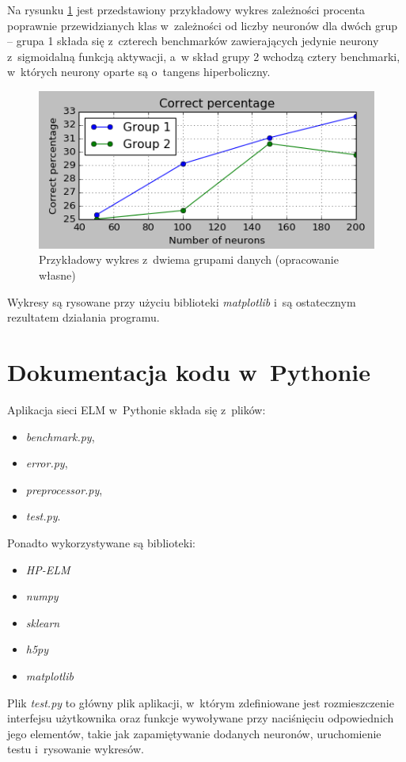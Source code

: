 \documentclass[pl]{minipw} %
\begin{document}
Na rysunku \ref{przykladowy} jest przedstawiony przykładowy wykres zależności procenta poprawnie przewidzianych klas w~zależności od liczby neuronów dla dwóch grup -- grupa 1 składa się z~czterech benchmarków zawierających jedynie neurony z~sigmoidalną funkcją aktywacji, a~w skład grupy 2 wchodzą cztery benchmarki, w~których neurony oparte są o~tangens hiperboliczny. 
 
\begin{figure}[H]
\includegraphics[width=\textwidth]{przykladowy_wykres.png}
\caption[Przykładowy wykres z~dwiema grupami danych]{Przykładowy wykres z~dwiema grupami danych (opracowanie własne)}
\label{przykladowy}
\end{figure}


Wykresy są rysowane przy użyciu biblioteki \textit{matplotlib} i~są ostatecznym rezultatem działania programu.

\section{Dokumentacja kodu w~Pythonie}
Aplikacja sieci ELM w~Pythonie składa się z~plików:
\begin{itemize}
\item \textit{benchmark.py},
\item \textit{error.py}, 
\item \textit{preprocessor.py},
\item \textit{test.py}.
\end{itemize}
Ponadto wykorzystywane są biblioteki:
\begin{itemize}
\item \textit{HP-ELM}
\item \textit{numpy}
\item \textit{sklearn}
\item \textit{h5py}
\item \textit{matplotlib}
\end{itemize}
Plik \textit{test.py} to główny plik aplikacji, w~którym zdefiniowane jest rozmieszczenie interfejsu użytkownika oraz funkcje wywoływane przy naciśnięciu odpowiednich jego elementów, takie jak zapamiętywanie dodanych neuronów, uruchomienie testu i~rysowanie wykresów.
\end{document}

